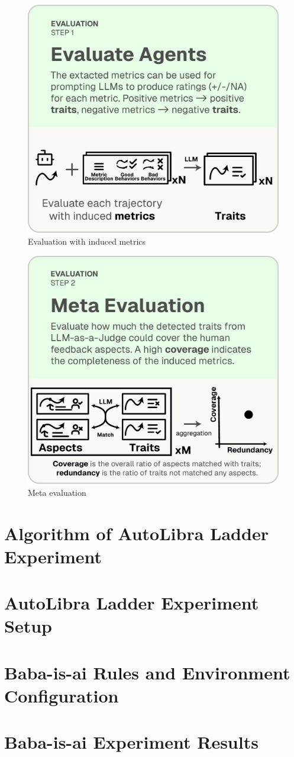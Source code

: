 \documentclass[../main.tex]{subfiles}
\begin{document}
\begin{figure}[!h]
	\includegraphics[width=0.4\linewidth]{figs/autolibra_step_3.pdf}
	\caption{Evaluation with induced metrics}
	\label{fig:llm_as_a_judge}
\end{figure}


\begin{figure}[!h]
	\includegraphics[width=0.4\linewidth]{figs/autolibra_step_4.pdf}
	\caption{Meta evaluation}
	\label{fig:meta_evaluation}
\end{figure}



\section{Algorithm of AutoLibra Ladder Experiment}
\label{appendix:algo1}


\section{AutoLibra Ladder Experiment Setup}
\label{appendix:autolibra_setup}


\section{Baba-is-ai Rules and Environment Configuration}
\label{appendix:baba_is_ai_rules}


\section{Baba-is-ai Experiment Results}
\label{appendix:heldout}

\end{document}

